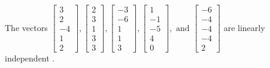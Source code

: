 \begin{exercise}
\begin{exerciseStatement}
  \end{exerciseStatement}
  \begin{exerciseAnswer}
   The vectors \(\left[\begin{array}{r}
3 \\
2 \\
-4 \\
1 \\
2
\end{array}\right] , \left[\begin{array}{r}
2 \\
3 \\
1 \\
3 \\
3
\end{array}\right] , \left[\begin{array}{r}
-3 \\
-6 \\
1 \\
1 \\
3
\end{array}\right] , \left[\begin{array}{r}
1 \\
-1 \\
-5 \\
4 \\
0
\end{array}\right] , \text{ and } \left[\begin{array}{r}
-6 \\
-4 \\
-4 \\
-4 \\
2
\end{array}\right]\) are 
  	 linearly independent  .
  


  \end{exerciseAnswer}
\end{exercise}
